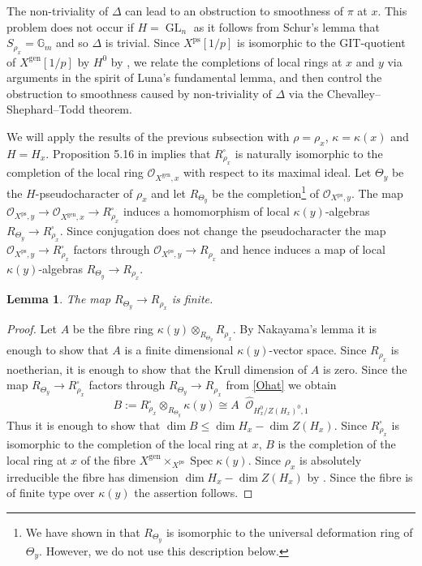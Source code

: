 \documentclass{amsart}
\newtheorem{lem}[prop]{Lemma}
\theoremstyle{definition}
\theoremstyle{remark}
\DeclareMathOperator{\GL}{GL}
\DeclareMathOperator{\Spec}{Spec}
\newcommand{\OO}{\mathcal O}
\DeclareMathOperator{\wtimes}{\widehat{\otimes}}
\newcommand{\Gm}{\mathbb G_m}
\newcommand{\gen}{\mathrm{gen}}
\newcommand{\ps}{\mathrm{ps}}
\newcommand{\Ohat}{\widehat{\OO}}
\begin{document}
The non-triviality of $\Delta$ can lead to an 
obstruction to smoothness 
of $\pi$ at $x$. This problem does not occur 
if $H=\GL_n$ as it follows from Schur's lemma that $S_{\rho_x}=\Gm$ and so $\Delta$ is trivial. 
Since $X^{\ps}[1/p]$ is isomorphic to the GIT-quotient of $X^{\gen}[1/p]$ by $H^0$ by , we relate the completions
of local rings at $x$ and $y$ via arguments in the spirit of Luna's fundamental lemma, and then control the 
obstruction to smoothness caused by non-triviality of $\Delta$ via the Chevalley--Shephard--Todd theorem. 



We will apply the results of the previous subsection 
with $\rho=\rho_x$, $\kappa=\kappa(x)$ and $H=H_x$. 
Proposition 5.16 in \cite{defG}
implies that $R^{\square}_{\rho_x}$ is naturally isomorphic to the completion of the local ring 
$\OO_{X^{\gen},x}$ with respect to its maximal ideal. Let $\Theta_y$ be the 
$H$-pseudocharacter of $\rho_x$ and 
let $R_{\Theta_y}$ be the completion\footnote{We have shown in \cite[Proposition 7.2]{MRL} that $R_{\Theta_y}$ is isomorphic
to the universal deformation ring of $\Theta_y$. However, we do not use this description below.} 
of $\OO_{X^{\ps},y}$. The map 
$\OO_{X^{\ps}, y}\rightarrow \OO_{X^{\gen}, x}\rightarrow R^{\square}_{\rho_x}$ induces 
a homomorphism of local $\kappa(y)$-algebras
$R_{\Theta_y}\rightarrow R^{\square}_{\rho_x}$. 
 Since conjugation does
not change the pseudocharacter the map 
$\OO_{X^{\ps}, y}\rightarrow R^{\square}_{\rho_x}$ 
factors through $\OO_{X^{\ps}, y}\rightarrow R_{\rho_x}$ and hence induces a map of local $\kappa(y)$-algebras  $R_{\Theta_y}\rightarrow R_{\rho_x}$. 

\begin{lem}\label{finite_ver} The map $R_{\Theta_y} \rightarrow R_{\rho_x}$ is finite.
\end{lem}
\begin{proof} Let $A$ be the 
fibre ring $\kappa(y)\otimes_{R_{\Theta_y}} R_{\rho_x}$. By Nakayama's lemma 
it is enough to show that $A$ is a finite dimensional 
$\kappa(y)$-vector space. Since $R_{\rho_x}$ is noetherian, it is enough to show that the Krull dimension of 
$A$ is zero. Since 
the map $R_{\Theta_y}\rightarrow R_{\rho_x}^{\square}$
factors through $R_{\Theta_y}\rightarrow R_{\rho_x}$ 
from \eqref{Ohat} we obtain 
\begin{equation}
B:= R^{\square}_{\rho_x}\otimes_{R_{\Theta_y}}\kappa(y) \cong A \wtimes \Ohat_{H_x^0/Z(H_x)^0,1}
\end{equation}
Thus it is enough to show that $\dim B \le \dim H_x -\dim Z(H_x)$. Since $R^{\square}_{\rho_x}$ is isomorphic to the completion of the local ring at $x$, 
$B$ is the 
completion of the local ring at $x$ of the 
fibre $X^{\gen} \times_{X^{\ps}} \Spec \kappa(y)$. Since $\rho_x$ is absolutely irreducible the 
fibre has dimension $\dim H_x -\dim Z(H_x)$ by 
\cite[Corollary 9.9]{defG}. Since the fibre 
is of finite type over $\kappa(y)$ 
the assertion follows. 
\end{proof}
\end{document}

